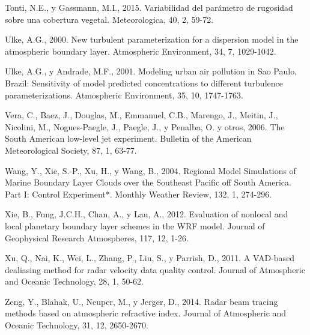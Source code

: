 \documentclass[12pt,spanish,oneside]{book}
\begin{document}
\hypertarget{ref-Tonti2015}{}
Tonti, N.E., y Gassmann, M.I., 2015. Variabilidad del parámetro de
rugosidad sobre una cobertura vegetal. Meteorologica, 40, 2, 59-72.

\hypertarget{ref-Ulke2000}{}
Ulke, A.G., 2000. New turbulent parameterization for a dispersion model
in the atmospheric boundary layer. Atmospheric Environment, 34, 7,
1029-1042.

\hypertarget{ref-Ulke2001}{}
Ulke, A.G., y Andrade, M.F., 2001. Modeling urban air pollution in Sao
Paulo, Brazil: Sensitivity of model predicted concentrations to
different turbulence parameterizations. Atmospheric Environment, 35, 10,
1747-1763.

\hypertarget{ref-Vera2006}{}
Vera, C., Baez, J., Douglas, M., Emmanuel, C.B., Marengo, J., Meitin,
J., Nicolini, M., Nogues-Paegle, J., Paegle, J., y Penalba, O. y otros,
2006. The South American low-level jet experiment. Bulletin of the
American Meteorological Society, 87, 1, 63-77.

\hypertarget{ref-Wang2004}{}
Wang, Y., Xie, S.-P., Xu, H., y Wang, B., 2004. Regional Model
Simulations of Marine Boundary Layer Clouds over the Southeast Pacific
off South America. Part I: Control Experiment*. Monthly Weather Review,
132, 1, 274-296.

\hypertarget{ref-Xie2012}{}
Xie, B., Fung, J.C.H., Chan, A., y Lau, A., 2012. Evaluation of nonlocal
and local planetary boundary layer schemes in the WRF model. Journal of
Geophysical Research Atmospheres, 117, 12, 1-26.

\hypertarget{ref-Xu2011}{}
Xu, Q., Nai, K., Wei, L., Zhang, P., Liu, S., y Parrish, D., 2011. A
VAD-based dealiasing method for radar velocity data quality control.
Journal of Atmospheric and Oceanic Technology, 28, 1, 50-62.

\hypertarget{ref-Zeng2014}{}
Zeng, Y., Blahak, U., Neuper, M., y Jerger, D., 2014. Radar beam tracing
methods based on atmospheric refractive index. Journal of Atmospheric
and Oceanic Technology, 31, 12, 2650-2670.
\end{document}
